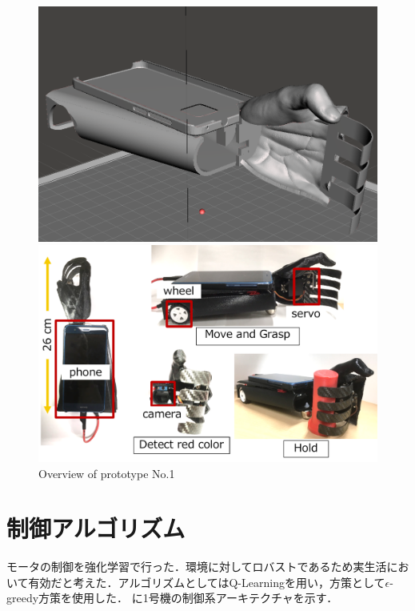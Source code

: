 \begin{figure}[H]
    \centering
    \begin{minipage}{\linewidth}
        \centering
        \includegraphics[width=0.7\linewidth]{figure/chapter3/robothand-v1_cad}
    \end{minipage}
    \begin{minipage}{\linewidth}
        \centering
        \includegraphics[width=\linewidth]{figure/chapter3/1号機外観}
    \end{minipage}
    \caption{Overview of prototype No.1}
    \label{fig:1号機外観}
\end{figure}


\section{制御アルゴリズム}
モータの制御を強化学習で行った．環境に対してロバストであるため実生活において有効だと考えた．アルゴリズムとしてはQ-Learningを用い，方策として$\epsilon$-greedy方策を使用した．
に1号機の制御系アーキテクチャを示す．


